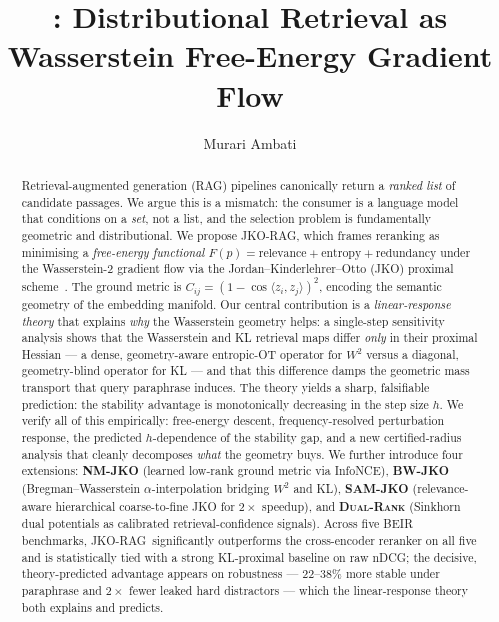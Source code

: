 \documentclass{article}
\title{\jko: Distributional Retrieval as \\
       Wasserstein Free-Energy Gradient Flow}
\author{%
  Murari Ambati
}
\theoremstyle{plain}
\newcommand{\jko}{\textsc{JKO-RAG}}
\newcommand{\bwjko}{\textsc{BW-JKO}}
\newcommand{\nmjko}{\textsc{NM-JKO}}
\newcommand{\samjko}{\textsc{SAM-JKO}}
\newcommand{\dualrank}{\textsc{Dual-Rank}}
\begin{document}
\maketitle

\begin{abstract}
Retrieval-augmented generation (RAG) pipelines canonically return a \emph{ranked list} of candidate passages. We argue this is a mismatch: the consumer is a language model that conditions on a \emph{set}, not a list, and the selection problem is fundamentally geometric and distributional. We propose \jko, which frames reranking as minimising a \emph{free-energy functional} $F(p)=\text{relevance} + \text{entropy} + \text{redundancy}$ under the Wasserstein-2 gradient flow via the Jordan--Kinderlehrer--Otto (JKO) proximal scheme~\cite{jko1998}. The ground metric is $C_{ij}=(1-\cos\langle z_i,z_j\rangle)^2$, encoding the semantic geometry of the embedding manifold.
Our central contribution is a \emph{linear-response theory} that explains \emph{why} the Wasserstein geometry helps: a single-step sensitivity analysis shows that the Wasserstein and KL retrieval maps differ \emph{only} in their proximal Hessian --- a dense, geometry-aware entropic-OT operator for $W^2$ versus a diagonal, geometry-blind operator for KL --- and that this difference damps the geometric mass transport that query paraphrase induces. The theory yields a sharp, falsifiable prediction: the stability advantage is monotonically decreasing in the step size $h$. We verify all of this empirically: free-energy descent, frequency-resolved perturbation response, the predicted $h$-dependence of the stability gap, and a new certified-radius analysis that cleanly decomposes \emph{what} the geometry buys.
We further introduce four extensions: \textbf{\nmjko} (learned low-rank ground metric via InfoNCE), \textbf{\bwjko} (Bregman--Wasserstein $\alpha$-interpolation bridging $W^2$ and KL), \textbf{\samjko} (relevance-aware hierarchical coarse-to-fine JKO for $2\times$ speedup), and \textbf{\dualrank} (Sinkhorn dual potentials as calibrated retrieval-confidence signals). Across five BEIR benchmarks, \jko\ significantly outperforms the cross-encoder reranker on all five and is statistically tied with a strong KL-proximal baseline on raw nDCG; the decisive, theory-predicted advantage appears on robustness --- 22--38\% more stable under paraphrase and $2\times$ fewer leaked hard distractors --- which the linear-response theory both explains and predicts.
\end{abstract}
\end{document}
